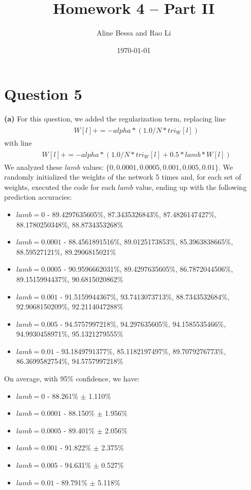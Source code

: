 \documentclass[leqno]{article}
\title{Homework 4 -- Part II}
\author{Aline Bessa and Rao Li}
\date\today
\begin{document}
\maketitle %

\section*{Question 5} \textbf{(a)} For this question, we added the regularization term, replacing line
\begin{gather*}
\begin{split}
&W[l] += -alpha * (1.0/N * tri_W[l])
\end{split}
\end{gather*}
with line
\begin{gather*}
\begin{split}
&W[l] += -alpha * (1.0/N * tri_W[l] + 0.5 * lamb * W[l])
\end{split}
\end{gather*}
We analyzed these $lamb$ values: $\{0, 0.0001, 0.0005, 0.001, 0.005, 0.01\}$.
We randomly initialized the weights of the network 5 times and, for each set of weights, executed the code for each $lamb$ value, ending up with the following 
prediction accuracies:
\begin{itemize}
\item $lamb = 0$ - 89.4297635605\%, 87.3435326843\%, 87.4826147427\%, 88.1780250348\%, 88.8734353268\%
\item $lamb = 0.0001$ - 88.4561891516\%, 89.0125173853\%, 85.3963838665\%, 88.59527121\%, 89.2906815021\%
\item $lamb = 0.0005$ - 90.9596662031\%, 89.4297635605\%, 86.7872044506\%, 89.1515994437\%, 90.6815020862\%
\item $lamb = 0.001$ - 91.5159944367\%, 93.7413073713\%, 88.7343532684\%, 92.9068150209\%, 92.2114047288\%
\item $lamb = 0.005$ - 94.5757997218\%, 94.297635605\%, 94.1585535466\%, 94.9930458971\%, 95.1321279555\%
\item $lamb = 0.01$ - 93.1849791377\%, 85.1182197497\%, 89.7079276773\%, 86.3699582754\%, 94.5757997218\% 
\end{itemize} 
On average, with 95\% confidence, we have:
\begin{itemize}
\item $lamb = 0$ - 88.261\% $\pm$ 1.110\%
\item $lamb = 0.0001$ - 88.150\% $\pm$ 1.956\% 
\item $lamb = 0.0005$ - 89.401\% $\pm$ 2.056\% 
\item $lamb = 0.001$ - 91.822\% $\pm$ 2.375\%
\item $lamb = 0.005$ - 94.631\% $\pm$ 0.527\%
\item $lamb = 0.01$ - 89.791\% $\pm$ 5.118\% 
\end{itemize} 
\end{document}
